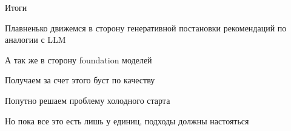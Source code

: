 \documentclass[11pt,aspectratio=169,handout]{beamer}
\begin{document}
\begin{frame}{Итоги}

\begin{tcolorbox}[colback=info!5,colframe=info!80,title=]
Плавненько движемся в сторону генеративной постановки рекомендаций по аналогии с LLM
\end{tcolorbox}

\begin{tcolorbox}[colback=warn!5,colframe=warn!80,title=]
А так же в сторону foundation моделей
\end{tcolorbox}

\begin{tcolorbox}[colback=warn!5,colframe=warn!80,title=]
Получаем за счет этого буст по качеству
\end{tcolorbox}

\begin{tcolorbox}[colback=warn!5,colframe=warn!80,title=]
Попутно решаем проблему холодного старта
\end{tcolorbox}

\begin{tcolorbox}[colback=warn!5,colframe=warn!80,title=]
Но пока все это есть лишь у единиц, подходы должны настояться
\end{tcolorbox}

\end{frame}
\end{document}
